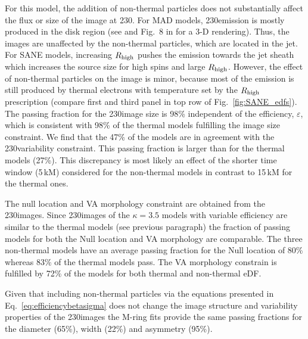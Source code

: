 \label{varkappa230}

For this model, the addition of non-thermal particles does not substantially affect the flux or size of the image at 230\GHz.
For MAD models, 230\GHz emission is mostly produced in the disk region (see  and Fig.~8 in \citealt{Wong_2022} for a 3-D rendering).
Thus, the images are unaffected by the non-thermal particles, which are located in the jet.
For SANE models, increasing $R_\mathrm{high}$ pushes the emission towards the jet sheath which increases the source size for high spins and large $R_\mathrm{high}$.
However, the effect of non-thermal particles on the image is minor, because most of the emission is still produced by thermal electrons with temperature set by the $R_\mathrm{high}$ prescription (compare first and third panel in top row of Fig.~\ref{fig:SANE_edfs}).
The passing fraction for the 230\GHz image size is 98\% independent of the efficiency, $\varepsilon$, which is consistent with 98\% of the thermal models fulfilling the image size constraint.
We find that the 47\% of the models are in agreement with the 230\GHz variability constraint.
This passing fraction is larger than for the thermal models (27\%).
This discrepancy is most likely an effect of the shorter time window (5\,kM) considered for the non-thermal models in contrast to 15\,kM for the thermal ones.


The null location and VA morphology constraint are obtained from the 230\GHz images.
Since 230\GHz images of the $\kappa=3.5$ models with variable efficiency are similar to the thermal models (see previous paragraph) the fraction of passing models for both the Null location and VA morphology are comparable.
The three non-thermal models have an average passing fraction for the Null location of 80\% whereas 83\% of the thermal models pass.
The VA morphology constrain is fulfilled by 72\% of the models for both thermal and non-thermal eDF.


Given that including non-thermal particles via the equations presented in Eq.~\ref{eq:efficiencybetasigma} does not change the image structure and variability properties of the 230\GHz images the M-ring fits provide the same passing fractions for the diameter (65\%), width (22\%) and asymmetry (95\%).

